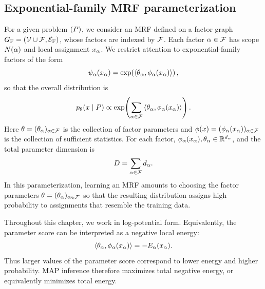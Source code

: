 \subsection{Exponential-family MRF parameterization}
For a given problem $(P)$, we consider an MRF defined on a factor graph $G_{\mathrm{F}}=(\mathcal{V} \cup \mathcal{F},\mathcal{E}_{\mathrm{F}})$, whose factors are indexed by $\mathcal{F}$. Each factor $\alpha \in \mathcal{F}$ has scope $N(\alpha)$ and local assignment $x_{\alpha}$. We restrict attention to exponential-family factors of the form
\begin{equation}
\psi_{\alpha}(x_{\alpha})
=
\exp\!\left(
    \left\langle
    \theta_{\alpha},
    \phi_{\alpha}(x_{\alpha})
    \right\rangle
\right),
\end{equation}
so that the overall distribution is
\begin{equation}
    p_{\theta}(x \mid P)
    \propto
    \exp \!\left(
        \sum_{\alpha \in \mathcal{F}}
        \left\langle
        \theta_{\alpha},
        \phi_{\alpha}(x_{\alpha})
        \right\rangle
    \right).
\end{equation}
Here $\theta = (\theta_{\alpha})_{\alpha \in \mathcal{F}}$ is the collection of factor parameters and $\phi(x) = (\phi_{\alpha}(x_{\alpha}))_{\alpha \in \mathcal{F}}$ is the collection of sufficient statistics. For each factor, $\phi_{\alpha}(x_{\alpha}), \theta_{\alpha} \in \mathbb{R}^{d_{\alpha}}$, and the total parameter dimension is
\begin{equation*}
    D = \sum_{\alpha \in \mathcal{F}} d_{\alpha}.
\end{equation*}
In this parameterization, learning an MRF amounts to choosing the factor parameters $\theta = (\theta_{\alpha})_{\alpha \in \mathcal{F}}$ so that the resulting distribution assigns high probability to assignments that resemble the training data.

Throughout this chapter, we work in log-potential form. Equivalently, the parameter score can be interpreted as a negative local energy:
\begin{equation*}
    \langle \theta_{\alpha},
    \phi_{\alpha}(x_{\alpha}) \rangle
    =
    -E_{\alpha}(x_{\alpha}).
\end{equation*}
Thus larger values of the parameter score correspond to lower energy and higher probability. MAP inference therefore maximizes total negative energy, or equivalently minimizes total energy.

